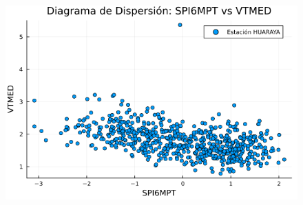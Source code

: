 \begin{figure}[htbp]
\begin{minipage}{0.32\textwidth}
    \includegraphics[width=\linewidth]{Capitulos/Scaterplot/HUARAYA_SPI6MPT_vs_VTMED.png}
\end{minipage}

\vspace{0.5cm}  %


\end{figure}
